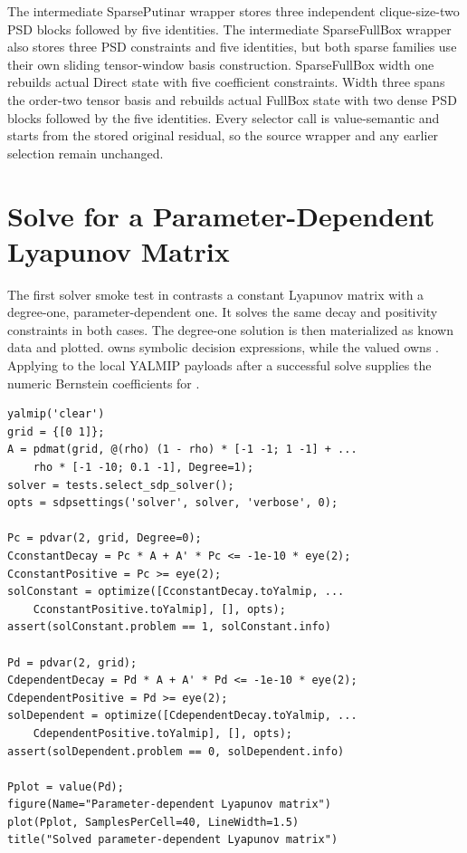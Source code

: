 The intermediate SparsePutinar wrapper stores three independent clique-size-two PSD blocks followed by five identities. The intermediate SparseFullBox wrapper also stores three PSD constraints and five identities, but both sparse families use their own sliding tensor-window basis construction. SparseFullBox width one rebuilds actual Direct state with five coefficient constraints. Width three spans the order-two tensor basis and rebuilds actual FullBox state with two dense PSD blocks followed by the five identities. Every selector call is value-semantic and starts from the stored original residual, so the source wrapper and any earlier selection remain unchanged.

\section{Solve for a Parameter-Dependent Lyapunov Matrix}
\label{sec:parameter-dependent-lyapunov-smoke}

The first solver smoke test in  contrasts a constant Lyapunov matrix with a degree-one, parameter-dependent one. It solves the same decay and positivity constraints in both cases. The degree-one solution is then materialized as known  data and plotted.  owns symbolic decision expressions, while the valued  owns . Applying  to the local YALMIP payloads after a successful solve supplies the numeric Bernstein coefficients for .

\begin{lstlisting}[style=dpmatlab]
yalmip('clear')
grid = {[0 1]};
A = pdmat(grid, @(rho) (1 - rho) * [-1 -1; 1 -1] + ...
    rho * [-1 -10; 0.1 -1], Degree=1);
solver = tests.select_sdp_solver();
opts = sdpsettings('solver', solver, 'verbose', 0);

Pc = pdvar(2, grid, Degree=0);
CconstantDecay = Pc * A + A' * Pc <= -1e-10 * eye(2);
CconstantPositive = Pc >= eye(2);
solConstant = optimize([CconstantDecay.toYalmip, ...
    CconstantPositive.toYalmip], [], opts);
assert(solConstant.problem == 1, solConstant.info)

Pd = pdvar(2, grid);
CdependentDecay = Pd * A + A' * Pd <= -1e-10 * eye(2);
CdependentPositive = Pd >= eye(2);
solDependent = optimize([CdependentDecay.toYalmip, ...
    CdependentPositive.toYalmip], [], opts);
assert(solDependent.problem == 0, solDependent.info)

Pplot = value(Pd);
figure(Name="Parameter-dependent Lyapunov matrix")
plot(Pplot, SamplesPerCell=40, LineWidth=1.5)
title("Solved parameter-dependent Lyapunov matrix")
\end{lstlisting}

